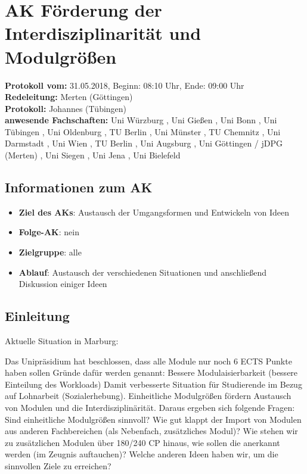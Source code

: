 
\section{AK Förderung der Interdisziplinarität und Modulgrößen}

  \textbf{Protokoll vom:} 31.05.2018,
  Beginn: 08:10 Uhr,
  Ende: 09:00 Uhr \\
  \textbf{Redeleitung:} Merten (Göttingen) \\
  \textbf{Protokoll:} Johannes (Tübingen) \\
  \textbf{anwesende Fachschaften:} Uni Würzburg , Uni Gießen , Uni Bonn , Uni Tübingen , Uni Oldenburg , TU Berlin , Uni Münster , TU Chemnitz , Uni Darmstadt , Uni Wien , TU Berlin , Uni Augsburg , Uni Göttingen / jDPG (Merten) , Uni Siegen , Uni Jena , Uni Bielefeld



  \subsection*{Informationen zum AK}
    \begin{itemize}
      \item \textbf{Ziel des AKs}: Austausch der Umgangsformen und Entwickeln von Ideen
      \item \textbf{Folge-AK}: nein
      \item \textbf{Zielgruppe}: alle
      \item \textbf{Ablauf}: Austausch der verschiedenen Situationen und anschließend Diskussion einiger Ideen
    \end{itemize}

  \subsection*{Einleitung}
    Aktuelle Situation in Marburg:
    \begin{outline}
      \1 Das Unipräsidium hat beschlossen, dass alle Module nur noch 6 ECTS Punkte haben sollen
      \1 Gründe dafür werden genannt:
        \2 Bessere Modulaisierbarkeit (bessere Einteilung des Workloads)
        \2 Damit verbesserte Situation für Studierende im Bezug auf Lohnarbeit (Sozialerhebung).
        \2 Einheitliche Modulgrößen fördern Austausch von Modulen und die Interdisziplinärität.
      \1 Daraus ergeben sich folgende Fragen:
        \2 Sind einheitliche Modulgrößen sinnvoll?
        \2 Wie gut klappt der Import von Modulen aus anderen Fachbereichen (als Nebenfach, zusätzliches Modul)?
        \2 Wie stehen wir zu zusätzlichen Modulen über 180/240 CP hinaus, wie sollen die anerkannt werden (im Zeugnis auftauchen)?
        \2 Welche anderen Ideen haben wir, um die sinnvollen Ziele zu erreichen?
    \end{outline}

